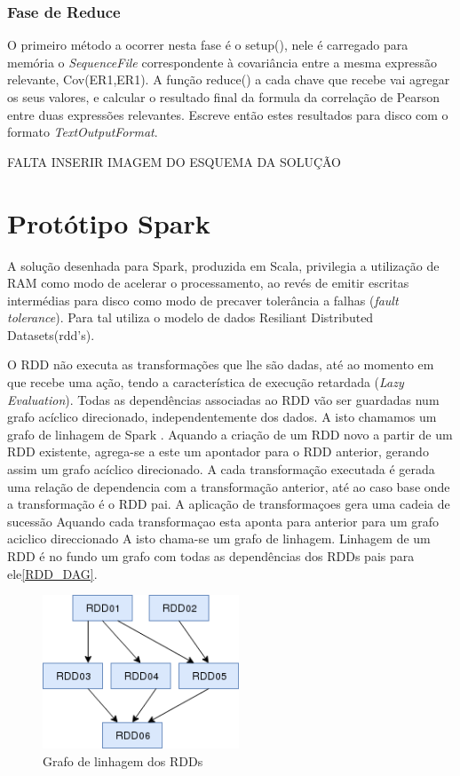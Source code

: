 \subsubsection{Fase de Reduce}
O primeiro método a ocorrer nesta fase é o setup(), nele é carregado para memória o \textit{SequenceFile} correspondente à covariância entre a mesma expressão relevante, Cov(ER1,ER1). A função reduce() a cada chave que recebe vai agregar os seus valores, e calcular o resultado final da formula da correlação de Pearson entre duas expressões relevantes. Escreve então estes resultados para disco com o formato \textit{TextOutputFormat}.

FALTA INSERIR IMAGEM DO ESQUEMA DA SOLUÇÃO


\section{Protótipo Spark}
A solução desenhada para Spark, produzida em Scala, privilegia a utilização de RAM como modo de acelerar o processamento, ao revés de emitir escritas intermédias para disco como modo de precaver tolerância a falhas (\textit{fault tolerance}). Para tal utiliza o modelo de dados Resiliant Distributed Datasets(rdd's).

O RDD não executa as transformações que lhe são dadas, até ao momento em que recebe uma ação, tendo a característica de execução retardada (\textit{Lazy Evaluation}). Todas as dependências associadas ao RDD vão ser guardadas num grafo acíclico direcionado, independentemente dos dados. A isto chamamos um grafo de linhagem de Spark \cite{spark_transf}. Aquando a criação de um RDD novo a partir de um RDD existente, agrega-se a este um apontador para o RDD anterior, gerando assim um grafo acíclico direcionado. A cada transformação executada é gerada uma relação de dependencia com a transformação anterior, até ao caso base onde a transformação é o RDD pai.
A aplicação de transformaçoes gera uma cadeia de sucessão
Aquando cada transformaçao esta aponta para anterior para um grafo aciclico direccionado
A isto chama-se um grafo de linhagem. Linhagem de um RDD é no fundo um grafo com todas as dependências dos RDDs pais para ele\ref{RDD_DAG}.



\begin{figure}[htbp]
\label{RDD_DAG}
	\centering
	\includegraphics[height=1.8in]{LaTeX/Chapters/Figures/RDD_DAG.png}
  \caption{Grafo de linhagem dos RDDs}
  \label{fig:fluxo_execucao}
\end{figure}



